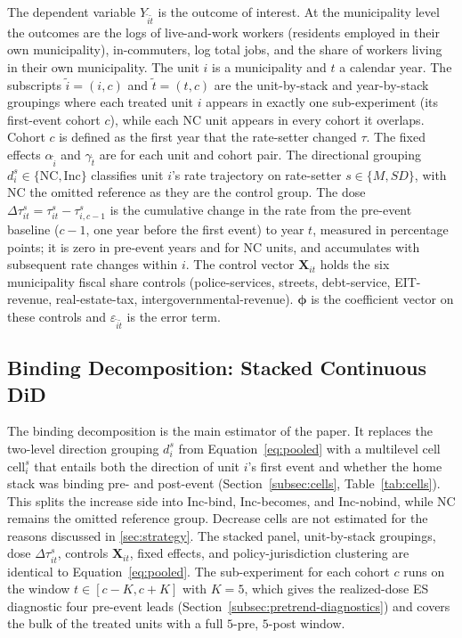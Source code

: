 \documentclass[12pt]{article}
\begin{document}
The dependent variable $Y_{\tilde i \tilde t}$ is the outcome of
interest. At the municipality level the
outcomes are the logs of live-and-work workers (residents employed
in their own municipality), in-commuters, log total jobs, and the
share of workers living in their own municipality. The unit $i$ is a municipality and $t$ a calendar year. The subscripts $\tilde i = (i, c)$ and
$\tilde t = (t, c)$ are the unit-by-stack and year-by-stack
groupings where each treated unit $i$ appears in exactly one
sub-experiment (its first-event cohort $c$), while each NC unit
appears in every cohort it overlaps. Cohort $c$ is defined as the first year that the rate-setter changed $\tau$. The fixed effects
$\alpha_{\tilde i}$ and $\gamma_{\tilde t}$ are for each unit and cohort pair. The directional grouping
$d^{s}_{i} \in \{\text{NC}, \text{Inc}\}$ classifies
unit $i$'s rate trajectory on rate-setter $s \in \{M, SD\}$, with
NC the omitted reference as they are the control group. The
dose $\Delta\tau^{s}_{it} = \tau^{s}_{it} - \tau^{s}_{i, c-1}$ is
the cumulative change in the rate from the pre-event baseline
($c-1$, one year before the first event) to year $t$, measured in
percentage points; it is zero in pre-event years and for NC units,
and accumulates with subsequent rate changes within $i$. The control vector
$\mathbf{X}_{it}$ holds the six municipality fiscal share controls
(police-services, streets, debt-service, EIT-revenue,
real-estate-tax, intergovernmental-revenue).
$\boldsymbol{\phi}$ is the
coefficient vector on these controls and $\varepsilon_{\tilde i \tilde t}$
is the error term.

\subsection{Binding Decomposition: Stacked Continuous DiD}
\label{subsec:stacked-continuous}

The binding decomposition is the main estimator of the paper. It
replaces the two-level direction grouping $d^s_i$ from
Equation~\ref{eq:pooled} with a multilevel cell
$\text{cell}^s_i$ that entails both the direction of unit $i$'s
first event and whether the home stack was binding pre- and
post-event (Section~\ref{subsec:cells}, Table~\ref{tab:cells}).
This splits the increase side into Inc-bind, Inc-becomes, and
Inc-nobind, while NC remains the omitted reference group. Decrease cells are
not estimated for the reasons discussed in
\ref{sec:strategy}. The stacked
panel, unit-by-stack groupings, dose $\Delta\tau^s_{it}$, controls
$\mathbf{X}_{it}$, fixed effects, and policy-jurisdiction
clustering are identical to Equation~\ref{eq:pooled}. The
sub-experiment for each cohort $c$ runs on the window
$t \in [c-K, c+K]$ with $K=5$, which gives the realized-dose ES
diagnostic four pre-event leads (Section~\ref{subsec:pretrend-diagnostics})
and covers the bulk of the treated units with a full $5$-pre,
$5$-post window.
\end{document}
